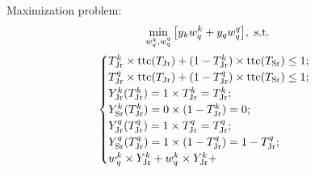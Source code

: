 \documentclass{elsarticle} %
\begin{document}
Maximization problem:
\begin{gather*}
    \min_{
        w_{q}^{k}, %
        w_{q}^{q} %
    }{%
        \left[
        y_{k} w_{q}^{k} + 
        y_{q} w_{q}^{q}
        \right]
    }, \text{ s.t. }\\ %
    \begin{cases}
        T_{\text{Jr}}^{k} \times \text{ttc}(T_{\text{Jr}}) + 
        (1 - T_{\text{Jr}}^{k}) \times \text{ttc}(T_{\text{Sr}}) 
        \leq 1
        ;\\
        T_{\text{Jr}}^{q} \times \text{ttc}(T_{\text{Jr}}) + 
        (1 - T_{\text{Jr}}^{q}) \times \text{ttc}(T_{\text{Sr}}) 
        \leq 1
        ;\\
        Y_{\text{Jr}}^k(T_{\text{Jr}}^{k}) = 1 \times T_{\text{Jr}}^{k} = T_{\text{Jr}}^{k}
        ;\\
        Y_{\text{Sr}}^k(T_{\text{Jr}}^{k}) = 0 \times (1 - T_{\text{Jr}}^{k}) = 0
        ;\\
        Y_{\text{Jr}}^q(T_{\text{Jr}}^{q}) = 1 \times T_{\text{Jr}}^{q} = T_{\text{Jr}}^{q}
        ;\\
        Y_{\text{Sr}}^q(T_{\text{Jr}}^{q}) = 1 \times (1 - T_{\text{Jr}}^{q}) = 1 - T_{\text{Jr}}^{q}
        ;\\
        w_{q}^{k} \times Y_{\text{Jr}}^k + 
        w_{q}^{k} \times Y_{\text{Jr}}^k + 
    \end{cases}
\end{gather*}
\end{document}
